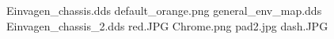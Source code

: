 Einvagen_chassis.dds
default_orange.png
general_env_map.dds
Einvagen_chassis_2.dds
red.JPG
Chrome.png
pad2.jpg
dash.JPG
